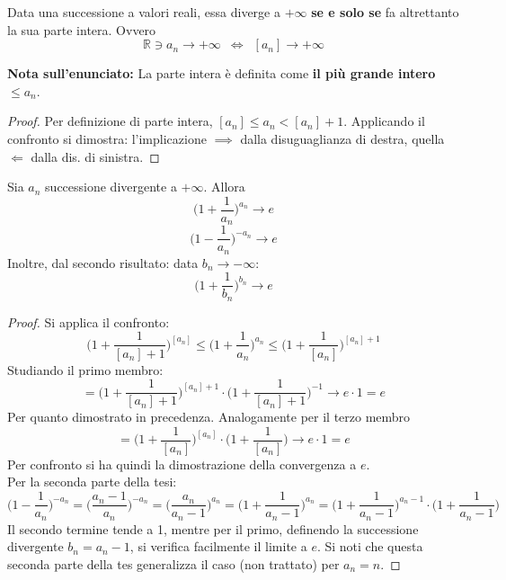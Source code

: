 \documentclass[10pt]{article}
\theoremstyle{plain}
\begin{document}
\begin{prop}
    Data una successione a valori reali, essa diverge a $+\infty$ \textbf{se e solo se} fa altrettanto la sua parte intera. Ovvero
    \[\mathbb{R} \owns a_n \rightarrow +\infty \enspace \Leftrightarrow \enspace [a_n] \rightarrow +\infty\]
\end{prop}
\textbf{Nota sull'enunciato: } La parte intera è definita come \textbf{il più grande intero} $\leq a_n$.
\begin{proof}
    Per definizione di parte intera, $[a_n] \leq a_n < [a_n] + 1$. Applicando il confronto si dimostra: l'implicazione $\implies$ dalla disuguaglianza di destra, quella $\Leftarrow$ dalla dis. di sinistra.
\end{proof}
\begin{prop}
    Sia $a_n$ successione divergente a $+\infty$. Allora
    \[\bigg(1 + \frac{1}{a_n}\bigg)^{a_n} \longrightarrow e\]
    \[\bigg(1 - \frac{1}{a_n}\bigg)^{-a_n} \longrightarrow e\]
    Inoltre, dal secondo risultato: data $b_n \rightarrow - \infty$:
     \[\bigg(1 + \frac{1}{b_n}\bigg)^{b_n} \longrightarrow e\]
\end{prop}
\begin{proof}
    Si applica il confronto:
    \[\bigg(1 + \frac{1}{[a_n]+1}\bigg)^{[a_n]} \leq \bigg(1 + \frac{1}{a_n}\bigg)^{a_n} \leq \bigg(1 + \frac{1}{[a_n]}\bigg)^{[a_n]+1}\]
    Studiando il primo membro:
    \[= \bigg(1 + \frac{1}{[a_n]+1}\bigg)^{[a_n]+1}\cdot \bigg(1 + \frac{1}{[a_n]+1}\bigg)^{-1} \rightarrow e \cdot 1 = e\]
    Per quanto dimostrato in precedenza. Analogamente per il terzo membro 
    \[= \bigg(1 + \frac{1}{[a_n]}\bigg)^{[a_n]} \cdot \bigg(1 + \frac{1}{[a_n]}\bigg) \rightarrow e \cdot 1 = e\]
    Per confronto si ha quindi la dimostrazione della convergenza a $e$.
    \\Per la seconda parte della tesi:
    \[\bigg(1 - \frac{1}{a_n}\bigg)^{-a_n} = \bigg(\frac{a_n - 1}{a_n}\bigg)^{-a_n} = \bigg(\frac{a_n}{a_n -1}\bigg)^{a_n} = \bigg(1+\frac{1}{a_n -1}\bigg)^{a_n} = \bigg(1+\frac{1}{a_n -1}\bigg)^{a_n-1} \cdot \bigg(1+\frac{1}{a_n -1}\bigg) \]
    Il secondo termine tende a 1, mentre per il primo, definendo la successione divergente $b_n = a_n - 1$, si verifica facilmente il limite a $e$. Si noti che questa seconda parte della tes generalizza il caso (non trattato) per $a_n = n$.
\end{proof}
\end{document}
